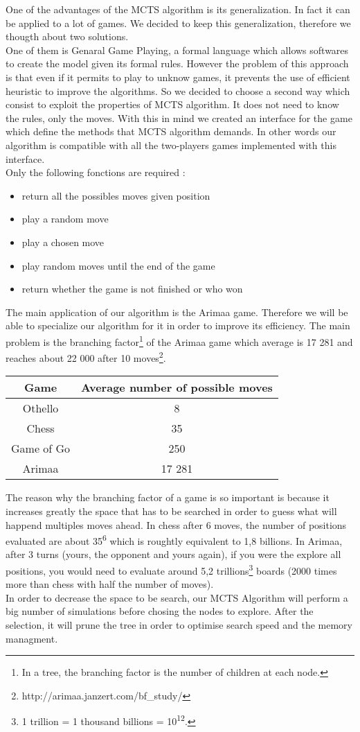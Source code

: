 One of the advantages of the MCTS algorithm is its generalization. In fact it can be applied to a lot of games. We decided to keep this generalization, therefore we thougth about two solutions.
\bigskip\\
One of them is Genaral Game Playing, a formal language which allows softwares to create the model given its formal rules. However the problem of this approach is that even if it permits to play to unknow games, it prevents the use of efficient heuristic to improve the algorithms.
So we decided to choose a second way which consist to exploit the properties of MCTS algorithm. 
It does not need to know the rules, only the moves. With this in mind we created an interface for the game which define the methods that MCTS algorithm demands. In other words our algorithm is compatible with all the two-players games implemented with this interface.
\bigskip\\
Only the following fonctions are required : 
\begin{itemize}
\item return all the possibles moves given position
\item play a random move
\item play a chosen move 
\item play random moves until the end of the game
\item return whether the game is not finished or who won
\end{itemize}
The main application of our algorithm is the Arimaa game. Therefore we will be able to specialize our algorithm for it in order to improve its efficiency. The main problem is the branching factor\footnote{In a tree, the branching factor is the number of children at each node.} of the Arimaa game which average is 17 281 and reaches about 22 000 after 10 moves\footnote{http://arimaa.janzert.com/bf\_study/}.\\
\bigskip
\begin{center}
	\begin{tabular}{ | c | c |}
		\hline Game & Average number of possible moves \\ \hline
		\hline  
		Othello & 8\\
		\hline  
		Chess & 35\\
		\hline  
		Game of Go & 250\\
		\hline
		Arimaa & 17 281\\
		\hline
	\end{tabular}
\end{center}
\bigskip
The reason why the branching factor of a game is so important is because it increases greatly the space that has to be searched in order to guess what will happend multiples moves ahead. In chess after 6 moves, the number of positions evaluated are about 35\textsuperscript{6} which is roughtly equivalent to 1,8 billions. In Arimaa, after 3 turns (yours, the opponent and yours again), if you were the explore all positions, you would need to evaluate around 5,2 trillions\footnote{1 trillion = 1 thousand billions = 10\textsuperscript{12}.} boards (2000 times more than chess with half the number of moves).
\bigskip\\
In order to decrease the space to be search, our MCTS Algorithm will perform a big number of simulations before chosing the nodes to explore. After the selection, it will prune the tree in order to optimise search speed and the memory managment.
